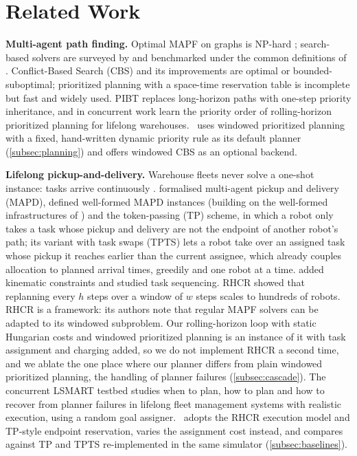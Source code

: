 \section{Related Work}\label{sec:related}

\noindent\textbf{Multi-agent path finding.}
Optimal MAPF on graphs is NP-hard \citep{yu2013structure}; search-based solvers
are surveyed by \citet{felner2017search} and benchmarked under the common
definitions of \citet{stern2019mapf}. Conflict-Based Search (CBS)
\citep{sharon2015cbs} and its improvements
\citep{boyarski2015icbs,li2019symmetry,li2021eecbs} are optimal or
bounded-suboptimal; prioritized planning
\citep{erdmann1987multiple,vandenberg2005prioritized,cap2015prioritized} with a
space-time reservation table \citep{silver2005cooperative} is incomplete but
fast and widely used. PIBT
\citep{okumura2019pibt,okumura2022pibt} replaces long-horizon paths with
one-step priority inheritance, and in concurrent work
\citet{zheng2026learning} learn the priority order of rolling-horizon
prioritized planning for lifelong warehouses. \sname\ uses windowed
prioritized planning with a fixed, hand-written dynamic priority rule as its
default planner (\cref{subsec:planning}) and offers windowed CBS as an
optional backend.

\noindent\textbf{Lifelong pickup-and-delivery.}
Warehouse fleets never solve a one-shot instance: tasks arrive continuously
\citep{wurman2008coordinating}. \citet{ma2017lifelong} formalised
multi-agent pickup and delivery (MAPD), defined well-formed MAPD instances
(building on the well-formed infrastructures of \citealp{cap2015complete}) and
the token-passing (TP) scheme, in which a robot only takes a task whose pickup
and delivery are not the endpoint of another robot's path; its variant with
task swaps (TPTS) lets a robot take over an assigned task whose pickup it
reaches earlier than the current assignee, which already couples allocation
to planned arrival times, greedily and one robot at a time.
\citet{ma2019lifelong} added kinematic constraints
and \citet{liu2019task} studied task sequencing. RHCR \citep{li2021rhcr}
showed that replanning every $h$ steps over a window of $w$ steps scales to
hundreds of robots. RHCR is a framework: its authors note that regular MAPF
solvers can be adapted to its windowed subproblem. Our rolling-horizon loop with static Hungarian costs and windowed
prioritized planning is an instance of it with task assignment and charging
added, so we do not implement RHCR a second time, and we ablate the one
place where our planner differs from plain windowed prioritized planning,
the handling of planner failures (\cref{subsec:cascade}). The concurrent
LSMART testbed \citep{yan2026lsmart} studies when to plan, how to plan and
how to recover from planner failures in lifelong fleet management systems
with realistic execution, using a random goal assigner. \sname\ adopts
the RHCR execution model and TP-style endpoint reservation, varies the
assignment cost instead, and compares against TP and TPTS re-implemented in
the same simulator (\cref{subsec:baselines}).


